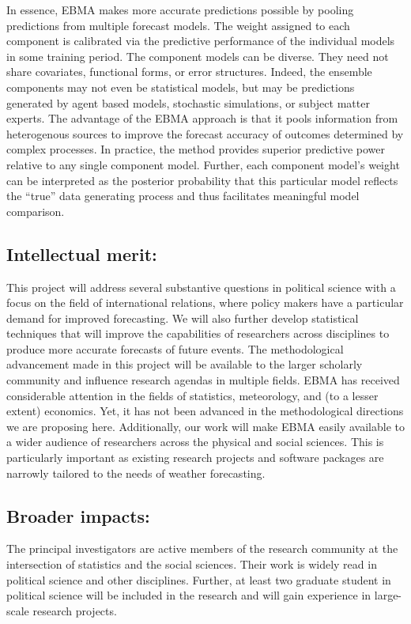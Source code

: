 \documentclass[pdftex,12pt,fullpage,oneside]{amsart}
\begin{document}
In essence, EBMA makes more accurate predictions possible by pooling
predictions from multiple forecast models. The weight assigned to each
component is calibrated via the predictive performance of the
individual models in some training period. The component
models can be diverse.  They need not share covariates, functional
forms, or error structures. Indeed, the ensemble components may not
even be statistical models, but may be predictions generated by agent
based models, stochastic simulations, or subject matter experts.  The
advantage of the EBMA approach is that it pools information from
heterogenous sources to improve the forecast accuracy of outcomes
determined by complex processes.  In practice, the method provides
superior predictive power relative to any single component
model. Further, each component model's weight can be interpreted as
the posterior probability that this particular model reflects the
``true'' data generating process and thus facilitates meaningful model
comparison.

\subsection*{Intellectual merit:} 
This project will address several substantive questions in political
science with a focus on the field of international relations, where policy makers have a particular demand for improved forecasting.  We will also further develop statistical techniques that will
improve the capabilities of researchers across disciplines to produce
more accurate forecasts of future events. The methodological
advancement made in this project will be available to the larger
scholarly community and influence research agendas in multiple fields.
EBMA has received considerable attention in the fields of statistics,
meteorology, and (to a lesser extent) economics.  Yet, it has not been
advanced in the methodological directions we are proposing here.
Additionally, our work will make EBMA easily available to a wider
audience of researchers across the physical and social sciences.  This
is particularly important as existing research projects and software packages
are narrowly tailored to the needs of weather forecasting.

\subsection*{Broader impacts:}
The principal investigators are active members of the research
community at the intersection of statistics and the social
sciences. Their work is widely read in political science and other
disciplines. Further, at least two graduate student in political
science will be included in the research and will gain experience in
large-scale research projects.
\end{document}
